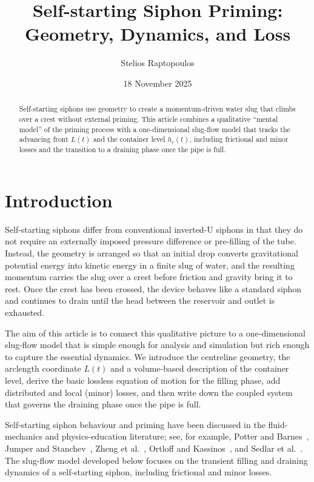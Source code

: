 \documentclass[11pt]{article}
\title{Self-starting Siphon Priming: Geometry, Dynamics, and Loss}
\author{Stelios Raptopoulos}
\date{18 November 2025}
\begin{document}
\maketitle

\begin{abstract}
Self-starting siphons use geometry to create a momentum-driven water slug that climbs
over a crest without external priming. This article combines a qualitative ``mental model'' of
the priming process with a one-dimensional slug-flow model that tracks the advancing front
$L(t)$ and the container level $h_c(t)$, including frictional and minor losses and the transition
to a draining phase once the pipe is full.
\end{abstract}

\tableofcontents

\bigskip

\section{Introduction}

Self-starting siphons differ from conventional inverted-U siphons in that they do not require
an externally imposed pressure difference or pre-filling of the tube. Instead, the geometry is
arranged so that an initial drop converts gravitational potential energy into kinetic energy in
a finite slug of water, and the resulting momentum carries the slug over a crest before friction
and gravity bring it to rest. Once the crest has been crossed, the device behaves like a standard
siphon and continues to drain until the head between the reservoir and outlet is exhausted.

The aim of this article is to connect this qualitative picture to a one-dimensional slug-flow
model that is simple enough for analysis and simulation but rich enough to capture the
essential dynamics. We introduce the centreline geometry, the arclength coordinate $L(t)$
and a volume-based description of the container level, derive the basic lossless equation
of motion for the filling phase, add distributed and local (minor) losses, and then write
down the coupled system that governs the draining phase once the pipe is full.

Self-starting siphon behaviour and priming have been discussed in the fluid-mechanics and
physics-education literature; see, for example, Potter and Barnes~\cite{potter_barnes}, Jumper and Stanchev~\cite{jumper_stanchev},
Zheng et al.~\cite{zheng_siphon}, Ortloff and Kassinos~\cite{ortloff_kassinos}, and Sedlar et al.~\cite{sedlar_siphon}.
The slug-flow model developed below focuses on the transient filling and draining dynamics
of a self-starting siphon, including frictional and minor losses.
\end{document}
